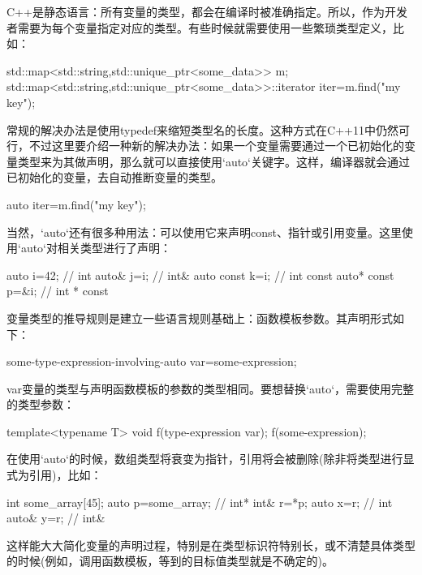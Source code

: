 
C++是静态语言：所有变量的类型，都会在编译时被准确指定。所以，作为开发者需要为每个变量指定对应的类型。有些时候就需要使用一些繁琐类型定义，比如：

\begin{cpp}
std::map<std::string,std::unique_ptr<some_data>> m;
std::map<std::string,std::unique_ptr<some_data>>::iterator
      iter=m.find("my key");
\end{cpp}

常规的解决办法是使用typedef来缩短类型名的长度。这种方式在C++11中仍然可行，不过这里要介绍一种新的解决办法：如果一个变量需要通过一个已初始化的变量类型来为其做声明，那么就可以直接使用`auto`关键字。这样，编译器就会通过已初始化的变量，去自动推断变量的类型。

\begin{cpp}
auto iter=m.find("my key");
\end{cpp}

当然，`auto`还有很多种用法：可以使用它来声明const、指针或引用变量。这里使用`auto`对相关类型进行了声明：

\begin{cpp}
auto i=42; // int
auto& j=i; // int&
auto const k=i; // int const
auto* const p=&i; // int * const
\end{cpp}

变量类型的推导规则是建立一些语言规则基础上：函数模板参数。其声明形式如下：

\begin{cpp}
some-type-expression-involving-auto var=some-expression;
\end{cpp}

var变量的类型与声明函数模板的参数的类型相同。要想替换`auto`，需要使用完整的类型参数：

\begin{cpp}
template<typename T>
void f(type-expression var);
f(some-expression);
\end{cpp}

在使用`auto`的时候，数组类型将衰变为指针，引用将会被删除(除非将类型进行显式为引用)，比如：

\begin{cpp}
int some_array[45];
auto p=some_array; // int*
int& r=*p;
auto x=r; // int
auto& y=r; // int&
\end{cpp}

这样能大大简化变量的声明过程，特别是在类型标识符特别长，或不清楚具体类型的时候(例如，调用函数模板，等到的目标值类型就是不确定的)。